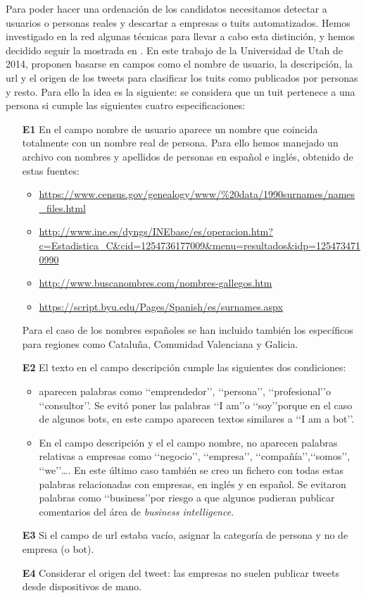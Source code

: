 Para poder hacer una ordenación de los candidatos necesitamos detectar a usuarios o personas reales 
y descartar a empresas o tuits automatizados. Hemos investigado en la red algunas técnicas 
para llevar a cabo esta distinción, y hemos decidido seguir la mostrada en \cite{user_class}.
En este trabajo de la Universidad de Utah de 2014, proponen basarse en campos como el nombre de usuario, 
la descripción, la url y el origen de los tweets para clasificar los tuits como publicados por personas 
y resto. Para ello la idea es la siguiente: se considera que un tuit pertenece a una persona si 
cumple las siguientes cuatro especificaciones:
\begin{itemize}
\item[{\bf E1}] En el campo nombre de usuario aparece un nombre que coincida totalmente con un nombre real 
de persona. Para ello hemos manejado un archivo con nombres y apellidos de personas en español e inglés, 
obtenido de estas fuentes:
\begin{itemize}
\item\url{ https://www.census.gov/genealogy/www/%20data/1990surnames/names_files.html }
\item\url{
http://www.ine.es/dyngs/INEbase/es/operacion.htm?c=Estadistica_C&cid=1254736177009&menu=resultados&idp=1254734710990 }
\item\url{http://www.buscanombres.com/nombres-gallegos.htm }
\item\url{https://script.byu.edu/Pages/Spanish/es/surnames.aspx }
\end{itemize}
Para el caso de los nombres españoles se han incluido también los específicos para regiones como Cataluña, Comunidad Valenciana y Galicia.
\item[{\bf E2}]El texto en el campo descripción cumple las siguientes dos condiciones:
\begin{itemize}
\item aparecen palabras como \lq\lq emprendedor\rq\rq, \lq\lq persona\rq\rq, 
\lq\lq profesional\rq\rq o \lq\lq consultor\rq\rq. Se evitó poner las palabras \lq\lq I am\rq\rq o 
\lq\lq soy\rq\rq porque en el caso de algunos bots, en este campo aparecen textos
similares a \lq\lq I am a bot\rq\rq. 
\item En el campo descripción y el el campo nombre, no aparecen palabras relativas a empresas como 
\lq\lq negocio\rq\rq, \lq\lq empresa\rq\rq, \lq\lq compañía\rq\rq,\lq\lq somos\rq\rq, \lq\lq we\rq\rq\dots.
En este último caso también se creo un fichero con todas estas palabras relacionadas con empresas, 
en inglés y en español. Se evitaron palabras como \lq\lq business\rq\rq por riesgo a que algunos pudieran 
publicar comentarios del área de {\em business intelligence}.
\end{itemize}
\item[{\bf E3}] Si el campo de url estaba vacío, asignar la categoría de persona y no de empresa (o bot).
\item[{\bf E4}] Considerar el origen del tweet: las empresas no suelen publicar tweets desde dispositivos de mano. 
\end{itemize}

